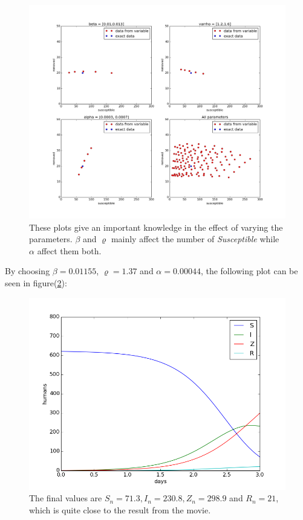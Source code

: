 \documentclass[%
twoside,                 %
final,                   %
10pt]{article}
\begin{document}
\begin{figure}[ht]
  \centerline{\includegraphics[width=0.9\linewidth]{plots/check_parameters.png}}
  \caption{
  \label{fig:initial_parameters} These plots give an important knowledge in the effect of varying the parameters. $\beta$ and $\varrho$ mainly affect the number of \emph{Susceptible} while $\alpha$ affect them both.
  }
\end{figure}


By choosing $\beta = 0.01155$, $\varrho=1.37$ and $\alpha=0.00044$, the following plot can be seen in figure(\ref{fig:initial_phase_2}):  


\begin{figure}[ht]
  \centerline{\includegraphics[width=0.9\linewidth]{plots/WD_zombie_initial_2.png}}
  \caption{
  \label{fig:initial_phase_2} The final values are $S_n=71.3,I_n=230.8,Z_n=298.9$ and $R_n=21$, which is quite close to the result from the movie.
  }
\end{figure}
\end{document}
